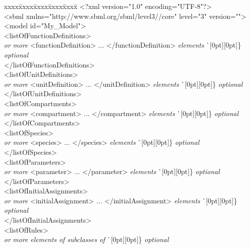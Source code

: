 \newcommand{\sayOptional}{\raisebox{0pt}[0pt][0pt]{\bigg\} \textrm{\emph{optional}}}}

\vspace*{2ex}
\begin{tt}
  \renewcommand{\baselinestretch}{0.82}
  \small
  \begin{tabbing}
xxxx\=xxxx\=xxxx\=xxxx\=xxxx\=\kill
\+\>
<?xml version="1.0" encoding="UTF-8"?>\\
<sbml xmlns="http://www.sbml.org/sbml/level3/\thisvlc/core" level="3" version="\sbmlversionnum">\\
\><model id="My\_Model">\\
\>\><listOfFunctionDefinitions>\\
\>\>\>\textrm{\emph{ or more}} <functionDefinition> ... </functionDefinition> \textrm{\emph{elements}}  \` \sayOptional\\
\>\></listOfFunctionDefinitions>\\
\>\><listOfUnitDefinitions>\\
\>\>\>\textrm{\emph{ or more}} <unitDefinition> ... </unitDefinition> \textrm{\emph{elements}}  \` \sayOptional\\
\>\></listOfUnitDefinitions>\\
\>\><listOfCompartments>\\
\>\>\>\textrm{\emph{ or more}} <compartment> ... </compartment> \textrm{\emph{elements}}  \` \sayOptional\\
\>\></listOfCompartments>\\
\>\><listOfSpecies>\\
\>\>\>\textrm{\emph{ or more}} <species> ... </species> \textrm{\emph{elements}}  \` \sayOptional\\
\>\></listOfSpecies>\\
\>\><listOfParameters>\\
\>\>\>\textrm{\emph{ or more}} <parameter> ... </parameter> \textrm{\emph{elements}}  \` \sayOptional\\
\>\></listOfParameters>\\
\>\><listOfInitialAssignments>\\
\>\>\>\textrm{\emph{ or more}} <initialAssignment> ... </initialAssignment> \textrm{\emph{elements}}  \` \sayOptional\\
\>\></listOfInitialAssignments>\\
\>\><listOfRules>\\
\>\>\>\textrm{\emph{ or more elements of subclasses of }}  \` \sayOptional\\

\end{tabbing}
\end{tt}
